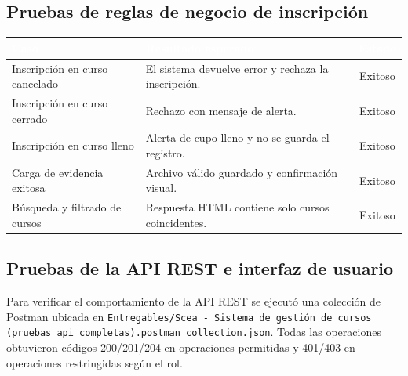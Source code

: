 \documentclass[11pt,letterpaper]{article}
\newcommand{\headrowcolor}{\rowcolor{azulUAZ}}
\newcommand{\headcell}[1]{\textcolor{white}{\textbf{#1}}}
\begin{document}
	\subsection{Pruebas de reglas de negocio de inscripci\'on}
	\begin{center}\small
		\begin{tabularx}{\linewidth}{|p{4.2cm}|X|c|}
			\hline
			\headrowcolor \headcell{Caso} & \headcell{Resultado esperado} & \headcell{Estado} \\ \hline
			Inscripci\'on en curso cancelado & El sistema devuelve error y rechaza la inscripci\'on. & Exitoso \\ \hline
			\rowcolor{grisAlt}
			Inscripci\'on en curso cerrado & Rechazo con mensaje de alerta. & Exitoso \\ \hline
			Inscripci\'on en curso lleno & Alerta de cupo lleno y no se guarda el registro. & Exitoso \\ \hline
			\rowcolor{grisAlt}
			Carga de evidencia exitosa & Archivo v\'alido guardado y confirmaci\'on visual. & Exitoso \\ \hline
			B\'usqueda y filtrado de cursos & Respuesta HTML contiene solo cursos coincidentes. & Exitoso \\ \hline
		\end{tabularx}
	\end{center}
	
	\subsection{Pruebas de la API REST e interfaz de usuario}
	Para verificar el comportamiento de la API REST se ejecut\'o una colecci\'on de Postman ubicada en \texttt{Entregables/Scea - Sistema de gesti\'on de cursos (pruebas api completas).postman\_collection.json}. Todas las operaciones obtuvieron c\'odigos 200/201/204 en operaciones permitidas y 401/403 en operaciones restringidas seg\'un el rol.
	
\end{document}
